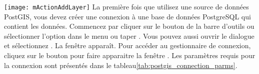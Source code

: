 \texttt{[image: mActionAddLayer]}
La première fois que utilisez une source de données PostGIS, vous devez créer une connexion à une base de données PostgreSQL qui contient les données. Commencez par cliquer sur le bouton  de la barre d'outils ou sélectionner l'option  dans le menu  ou taper . Vous pouvez aussi ouvrir le dialogue  et sélectionnez .
La fenêtre  apparaît. Pour accéder au gestionnaire de connexion, cliquez sur le bouton  pour faire apparaitre la fenêtre . Les paramètres requis pour la connexion sont présentés dans le tableau\ref{tab:postgis_connection_parms}.

